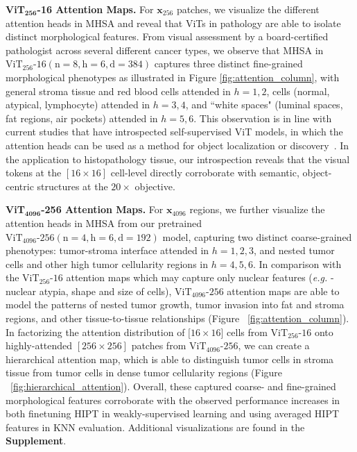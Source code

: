 {\textbf{ViT$_{\textbf{256}}$-16 Attention Maps.} For $\mathbf{x}_{256}$ patches, we visualize the different attention heads in MHSA and reveal that ViTs in pathology are able to isolate distinct morphological features. From visual assessment by a board-certified pathologist across several different cancer types, we observe that MHSA in $\operatorname{ViT_{256}\textrm{-}16(n=8, h=6, d=384)}$ captures three distinct fine-grained morphological phenotypes as illustrated in Figure \ref{fig:attention_column}, with general stroma tissue and red blood cells attended in $h=1,2$, cells (normal, atypical, lymphocyte) attended in $h=3,4$, and ``white spaces" (luminal spaces, fat regions, air pockets) attended in $h=5,6$. This observation is in line with current studies that have introspected  self-supervised ViT models, in which the attention heads can be used as a method for object localization or discovery~\cite{caron2021emerging, simeoni2021localizing}. In the application to histopathology tissue, our introspection reveals that the visual tokens at the $[16 \times 16]$ cell-level directly corroborate with semantic, object-centric structures at the $20\times$ objective.

\textbf{ViT$_{\textbf{4096}}$-256 Attention Maps.} For $\mathbf{x}_{4096}$ regions, we further visualize the attention heads in MHSA from our pretrained $\operatorname{ViT_{4096}\textrm{-}256(n=4, h=6, d=192)}$ model, capturing two distinct coarse-grained phenotypes: tumor-stroma interface attended in $h=1,2,3$, and nested tumor cells and other high tumor cellularity regions in $h=4,5,6$. In comparison with the $\operatorname{ViT_{256}\textrm{-}16}$ attention maps which may capture only nuclear features (\textit{e.g.} - nuclear atypia, shape and size of cells), $\operatorname{ViT_{4096}\textrm{-}256}$ attention maps are able to model the patterns of nested tumor growth, tumor invasion into fat and stroma regions, and other tissue-to-tissue relationships (Figure ~\ref{fig:attention_column}). In factorizing the attention distribution of $[16 \times 16$] cells from $\operatorname{ViT_{256}\textrm{-}16}$ onto highly-attended $[256 \times 256]$ patches from $\operatorname{ViT_{4096}\textrm{-}256}$, we can create a hierarchical attention map, which is able to distinguish tumor cells in stroma tissue from tumor cells in dense tumor cellularity regions (Figure ~\ref{fig:hierarchical_attention}). Overall, these captured coarse- and fine-grained morphological features corroborate with the observed performance increases in both finetuning HIPT in weakly-supervised learning and using averaged HIPT features in KNN evaluation. Additional visualizations are found in the \textbf{Supplement}.

}
